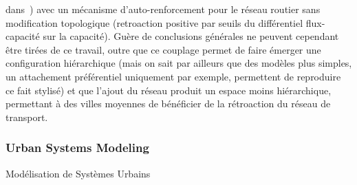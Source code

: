 { dans~\cite{sanders1992systeme}) avec un mécanisme d'auto-renforcement pour le réseau routier sans modification topologique (retroaction positive par seuils du différentiel flux-capacité sur la capacité). Guère de conclusions générales ne peuvent cependant être tirées de ce travail, outre que ce couplage permet de faire émerger une configuration hiérarchique (mais on sait par ailleurs que des modèles plus simples, un attachement préférentiel uniquement par exemple, permettent de reproduire ce fait stylisé) et que l'ajout du réseau produit un espace moins hiérarchique, permettant à des villes moyennes de bénéficier de la rétroaction du réseau de transport.
}







\subsubsection{Urban Systems Modeling}{Modélisation de Systèmes Urbains}



